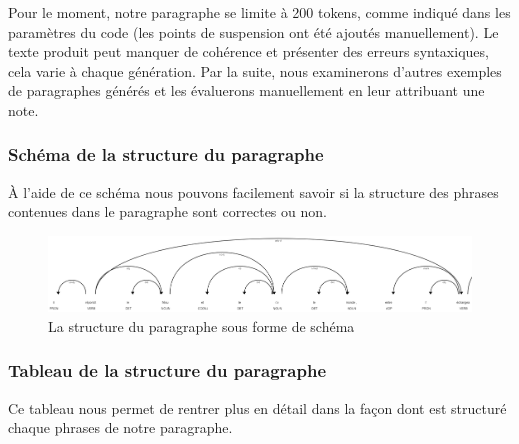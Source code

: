 \documentclass{rapport}
\begin{document}
               Pour le moment, notre paragraphe se limite à 200 tokens, comme indiqué dans les paramètres du code (les points de suspension ont été ajoutés manuellement). Le texte produit peut manquer de cohérence et présenter des erreurs syntaxiques, cela varie à chaque génération. Par la suite, nous examinerons d'autres exemples de paragraphes générés et les évaluerons manuellement en leur attribuant une note.

            \subsubsection{Schéma de la structure du paragraphe}

                À l'aide de ce schéma nous pouvons facilement savoir si la structure des phrases contenues dans le paragraphe sont correctes ou non.

                \begin{figure}[H]
                    \centering
                    \includegraphics[width=1\textwidth]{img/structure.png}
                    \caption{La structure du paragraphe sous forme de schéma}
                    \label{fig:structure}
                \end{figure}

            \subsubsection{Tableau de la structure du paragraphe}

                Ce tableau nous permet de rentrer plus en détail dans la façon dont est structuré chaque phrases de notre paragraphe.
\end{document}
